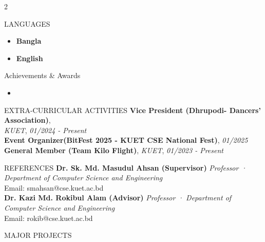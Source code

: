 \documentclass{resume} %
\begin{document}
\begin{paracol}{2}
\begin{rSection}{LANGUAGES}
\begin{itemize}
    \item 
    {\textbf{Bangla}} 
    \item {\textbf{English}}
\end{itemize}

\end{rSection}
\vspace{-0.3em}
\begin{rSection}{Achievements \& Awards}
\begin{itemize}
    \item {\href{https://www.coursera.org/account/accomplishments/certificate/LSXENVHK9LHT}{ }}
    
    
\end{itemize}
\end{rSection}
\vspace{-0.3em}
\begin{rSection}{EXTRA-CURRICULAR ACTIVITIES} 
{\bf Vice President (Dhrupodi- Dancers' Association)},\\ \textit{KUET}, \textit{01/2024 - Present}\\
{\bf Event Organizer(BitFest 2025 - KUET CSE National Fest)},
\textit{01/2025}\\
{\bf General Member (Team Kilo Flight)}, \textit{KUET}, \textit{01/2023 - Present}\\
\end{rSection}
\vspace{-1.5em}
\begin{rSection}{REFERENCES} 
{\bf Dr. Sk. Md. Masudul Ahsan (Supervisor)} \textit{Professor · Department of Computer Science and Engineering}\\ Email: smahsan@cse.kuet.ac.bd\\
{\bf Dr. Kazi Md. Rokibul Alam (Advisor)} \textit{Professor · Department of Computer Science and Engineering}\\ Email: rokib@cse.kuet.ac.bd\\
\end{rSection}
\switchcolumn
\vspace{0.2em}
\begin{rSection}{MAJOR PROJECTS}
\vspace{-1.3em}

\end{rSection}
\end{paracol}
\end{document}
